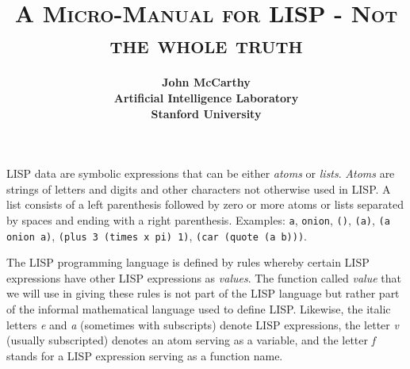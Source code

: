 \documentclass[8pt,letter,twocolumn]{article}
\title{\small \textbf{\textsc{{A Micro-Manual for LISP - Not the whole truth}}}}
\author{\footnotesize \bfseries John McCarthy\\
            \footnotesize \bfseries Artificial Intelligence Laboratory\\
            \footnotesize \bfseries Stanford University}
\date{}
\begin{document}
\setcounter{page}{215}
\maketitle


LISP data are symbolic expressions that can be either \textit{atoms} or
\textit{lists}. \textit{Atoms} are strings of letters and digits and other
characters not otherwise used in LISP. A list consists of a left parenthesis
followed by zero or more atoms or lists separated by spaces and ending with a
right parenthesis. Examples: \texttt{a}, \texttt{onion}, \texttt{()},
\texttt{(a)}, \texttt{(a onion a)}, \texttt{(plus 3 (times x pi) 1)},
\texttt{(car (quote (a b)))}.

The LISP programming language is defined by rules whereby certain LISP
expressions have other LISP expressions as \textit{values}. The function called
\textit{value} that we will use in giving these rules is not part of the LISP
language but rather part of the informal mathematical language used to define
LISP. Likewise, the italic letters \textit{e} and \textit{a} (sometimes with
subscripts) denote LISP expressions, the letter \textit{v} (usually subscripted)
denotes an atom serving as a variable, and the letter \textit{f} stands for a
LISP expression serving as a function name.
\end{document}
